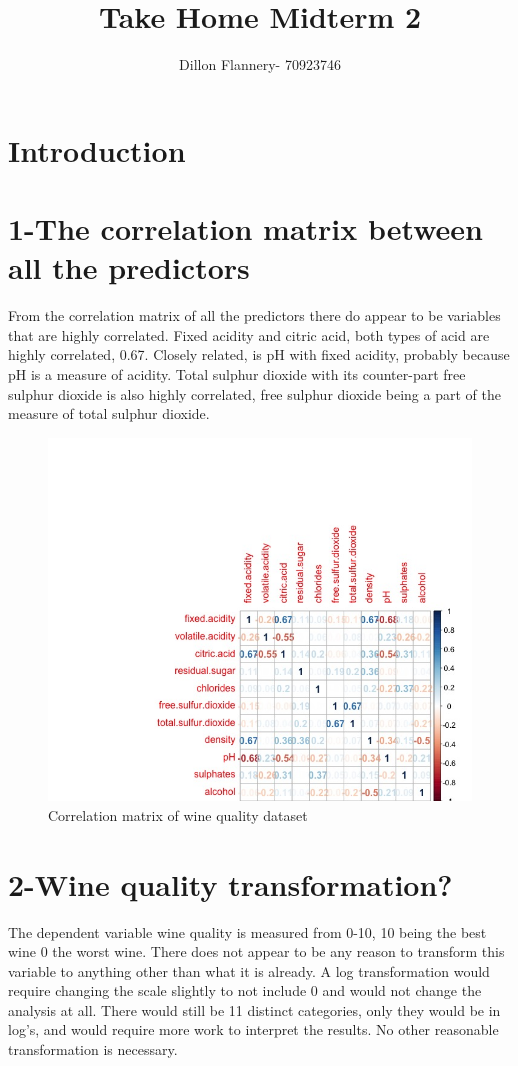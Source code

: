 \documentclass[]{article}
\title{Take Home Midterm 2 \vspace{-2ex}}
\author{Dillon Flannery- 70923746 \vspace{-2ex}}
\begin{document}
\maketitle

\section*{Introduction}
\section*{1-The correlation matrix between all the predictors}
From the correlation matrix of all the predictors there do appear to be variables that are highly correlated. Fixed acidity and citric acid, both types of acid are highly correlated, 0.67. Closely related, is pH with fixed acidity, probably because pH is a measure of acidity. Total sulphur dioxide with its counter-part free sulphur dioxide is also highly correlated, free sulphur dioxide being a part of the measure of total sulphur dioxide. 
\begin{figure}[H]
	\centering
	\includegraphics[trim={5cm, 0, 1cm, 1cm}, scale=.3]{corrgram}
	\caption{Correlation matrix of wine quality dataset}
\end{figure}


\section*{2-Wine quality transformation?}
The dependent variable wine quality is measured from 0-10, 10 being the best wine 0 the worst wine. There does not appear to be any reason to transform this variable to anything other than what it is already. A log transformation would require changing the scale slightly to not include 0 and would not change the analysis at all. There would still be 11 distinct categories, only they would be in log's, and would require more work to interpret the results. No other reasonable transformation is necessary.
\end{document}
